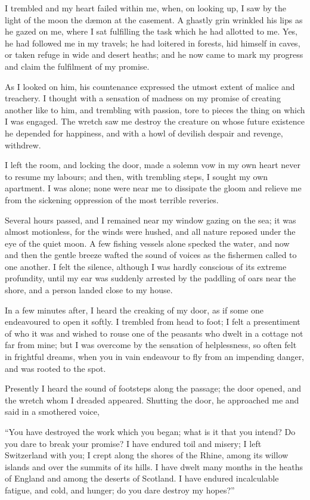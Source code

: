 \documentclass[12pt,openright]{book}
\begin{document}
I trembled and my heart failed within me, when, on looking up, I saw by the light of the moon the dæmon at the casement. A ghastly grin wrinkled his lips as he gazed on me, where I sat fulfilling the task which he had allotted to me. Yes, he had followed me in my travels; he had loitered in forests, hid himself in caves, or taken refuge in wide and desert heaths; and he now came to mark my progress and claim the fulfilment of my promise.

As I looked on him, his countenance expressed the utmost extent of malice and treachery. I thought with a sensation of madness on my promise of creating another like to him, and trembling with passion, tore to pieces the thing on which I was engaged. The wretch saw me destroy the creature on whose future existence he depended for happiness, and with a howl of devilish despair and revenge, withdrew.

I left the room, and locking the door, made a solemn vow in my own heart never to resume my labours; and then, with trembling steps, I sought my own apartment. I was alone; none were near me to dissipate the gloom and relieve me from the sickening oppression of the most terrible reveries.

Several hours passed, and I remained near my window gazing on the sea; it was almost motionless, for the winds were hushed, and all nature reposed under the eye of the quiet moon. A few fishing vessels alone specked the water, and now and then the gentle breeze wafted the sound of voices as the fishermen called to one another. I felt the silence, although I was hardly conscious of its extreme profundity, until my ear was suddenly arrested by the paddling of oars near the shore, and a person landed close to my house.

In a few minutes after, I heard the creaking of my door, as if some one endeavoured to open it softly. I trembled from head to foot; I felt a presentiment of who it was and wished to rouse one of the peasants who dwelt in a cottage not far from mine; but I was overcome by the sensation of helplessness, so often felt in frightful dreams, when you in vain endeavour to fly from an impending danger, and was rooted to the spot.

Presently I heard the sound of footsteps along the passage; the door opened, and the wretch whom I dreaded appeared. Shutting the door, he approached me and said in a smothered voice,

“You have destroyed the work which you began; what is it that you intend? Do you dare to break your promise? I have endured toil and misery; I left Switzerland with you; I crept along the shores of the Rhine, among its willow islands and over the summits of its hills. I have dwelt many months in the heaths of England and among the deserts of Scotland. I have endured incalculable fatigue, and cold, and hunger; do you dare destroy my hopes?”
\end{document}
